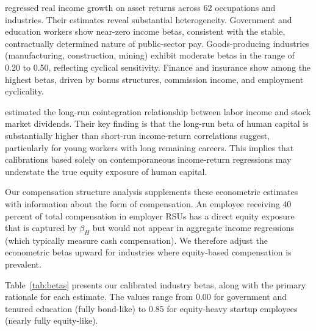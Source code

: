 \documentclass[11pt]{article}
\begin{document}
\citet{davis2000} regressed real income growth on asset returns across 62
occupations and industries. Their estimates reveal substantial
heterogeneity. Government and education workers show near-zero income
betas, consistent with the stable, contractually determined nature of
public-sector pay. Goods-producing industries (manufacturing, construction,
mining) exhibit moderate betas in the range of 0.20 to 0.50, reflecting
cyclical sensitivity. Finance and insurance show among the highest betas,
driven by bonus structures, commission income, and employment cyclicality.

\citet{benzoni2007} estimated the long-run cointegration relationship
between labor income and stock market dividends. Their key finding is that
the long-run beta of human capital is substantially higher than short-run
income-return correlations suggest, particularly for young workers with
long remaining careers. This implies that calibrations based solely on
contemporaneous income-return regressions may understate the true equity
exposure of human capital.

Our compensation structure analysis supplements these econometric estimates
with information about the form of compensation. An employee receiving 40
percent of total compensation in employer RSUs has a direct equity
exposure that is captured by $\beta_H$ but would not appear in aggregate
income regressions (which typically measure cash compensation). We
therefore adjust the econometric betas upward for industries where
equity-based compensation is prevalent.

Table~\ref{tab:betas} presents our calibrated industry betas, along with
the primary rationale for each estimate. The values range from 0.00 for
government and tenured education (fully bond-like) to 0.85 for
equity-heavy startup employees (nearly fully equity-like).
\end{document}
